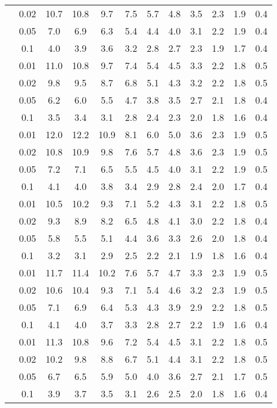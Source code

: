 \begin{tabular}{cccccccccccc}
 & 0.02 & 10.7 & 10.8 & 9.7 & 7.5 & 5.7 & 4.8 & 3.5 & 2.3 & 1.9 & 0.4 \\
 & 0.05 & 7.0 & 6.9 & 6.3 & 5.4 & 4.4 & 4.0 & 3.1 & 2.2 & 1.9 & 0.4 \\
 & 0.1 & 4.0 & 3.9 & 3.6 & 3.2 & 2.8 & 2.7 & 2.3 & 1.9 & 1.7 & 0.4 \\
\hline
[Si/H] & 0.01 & 11.0 & 10.8 & 9.7 & 7.4 & 5.4 & 4.5 & 3.3 & 2.2 & 1.8 & 0.5 \\
 & 0.02 & 9.8 & 9.5 & 8.7 & 6.8 & 5.1 & 4.3 & 3.2 & 2.2 & 1.8 & 0.5 \\
 & 0.05 & 6.2 & 6.0 & 5.5 & 4.7 & 3.8 & 3.5 & 2.7 & 2.1 & 1.8 & 0.4 \\
 & 0.1 & 3.5 & 3.4 & 3.1 & 2.8 & 2.4 & 2.3 & 2.0 & 1.8 & 1.6 & 0.4 \\
\hline
[P/H] & 0.01 & 12.0 & 12.2 & 10.9 & 8.1 & 6.0 & 5.0 & 3.6 & 2.3 & 1.9 & 0.5 \\
 & 0.02 & 10.8 & 10.9 & 9.8 & 7.6 & 5.7 & 4.8 & 3.6 & 2.3 & 1.9 & 0.5 \\
 & 0.05 & 7.2 & 7.1 & 6.5 & 5.5 & 4.5 & 4.0 & 3.1 & 2.2 & 1.9 & 0.5 \\
 & 0.1 & 4.1 & 4.0 & 3.8 & 3.4 & 2.9 & 2.8 & 2.4 & 2.0 & 1.7 & 0.4 \\
\hline
[S/H] & 0.01 & 10.5 & 10.2 & 9.3 & 7.1 & 5.2 & 4.3 & 3.1 & 2.2 & 1.8 & 0.5 \\
 & 0.02 & 9.3 & 8.9 & 8.2 & 6.5 & 4.8 & 4.1 & 3.0 & 2.2 & 1.8 & 0.4 \\
 & 0.05 & 5.8 & 5.5 & 5.1 & 4.4 & 3.6 & 3.3 & 2.6 & 2.0 & 1.8 & 0.4 \\
 & 0.1 & 3.2 & 3.1 & 2.9 & 2.5 & 2.2 & 2.1 & 1.9 & 1.8 & 1.6 & 0.4 \\
\hline
[V/H] & 0.01 & 11.7 & 11.4 & 10.2 & 7.6 & 5.7 & 4.7 & 3.3 & 2.3 & 1.9 & 0.5 \\
 & 0.02 & 10.6 & 10.4 & 9.3 & 7.1 & 5.4 & 4.6 & 3.2 & 2.3 & 1.9 & 0.5 \\
 & 0.05 & 7.1 & 6.9 & 6.4 & 5.3 & 4.3 & 3.9 & 2.9 & 2.2 & 1.8 & 0.5 \\
 & 0.1 & 4.1 & 4.0 & 3.7 & 3.3 & 2.8 & 2.7 & 2.2 & 1.9 & 1.6 & 0.4 \\
\hline
[Cr/H] & 0.01 & 11.3 & 10.8 & 9.6 & 7.2 & 5.4 & 4.5 & 3.1 & 2.2 & 1.8 & 0.5 \\
 & 0.02 & 10.2 & 9.8 & 8.8 & 6.7 & 5.1 & 4.4 & 3.1 & 2.2 & 1.8 & 0.5 \\
 & 0.05 & 6.7 & 6.5 & 5.9 & 5.0 & 4.0 & 3.6 & 2.7 & 2.1 & 1.7 & 0.5 \\
 & 0.1 & 3.9 & 3.7 & 3.5 & 3.1 & 2.6 & 2.5 & 2.0 & 1.8 & 1.6 & 0.4 \\

\end{tabular}
